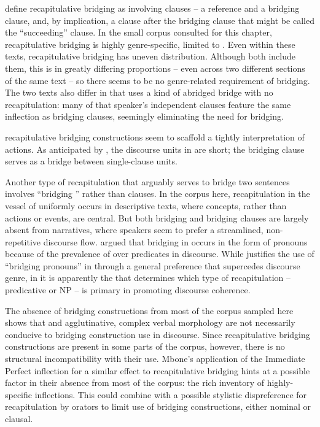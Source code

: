 \documentclass[output=paper]{LSP/langsci}
\begin{document}
 define recapitulative bridging as involving clauses -- a reference and a bridging clause, and, by implication, a clause after the bridging clause that might be called the ``succeeding'' clause. In the small corpus consulted for this chapter,  recapitulative bridging is highly genre-specific, limited to . Even within these texts, recapitulative bridging has uneven distribution. Although both  include them, this is in greatly differing proportions -- even across two different sections of the same text -- so there seems to be no genre-related requirement of bridging. The two texts also differ in that \citet{Mbone2014} uses a kind of abridged bridge with no recapitulation: many of that speaker’s independent clauses feature the same inflection as bridging clauses, seemingly eliminating the need for bridging.

 recapitulative bridging constructions seem to scaffold a tightly  interpretation of actions. As anticipated by , the discourse units in   are short; the bridging clause serves as a bridge between single-clause units. 

Another type of recapitulation that arguably serves to bridge two sentences involves ``bridging '' rather than clauses. In the  corpus here, recapitulation in the vessel of  uniformly occurs in descriptive texts, where concepts, rather than actions or events, are central. But both bridging  and bridging clauses are largely absent from narratives, where  speakers seem to prefer a streamlined, non-repetitive discourse flow. \citet{seifart10} argued that bridging in  occurs in the form of pronouns because of the prevalence of  over predicates in  discourse. While \citet{seifart10} justifies the use of ``bridging pronouns'' in  through a general preference that supercedes discourse genre, in  it is apparently the  that determines which type of recapitulation -- predicative or NP -- is primary in promoting discourse coherence.

The absence of bridging constructions from most of the  corpus sampled here shows that  and agglutinative, complex verbal morphology are not necessarily conducive to bridging construction use in discourse. Since recapitulative bridging constructions are present in some parts of the corpus, however, there is no structural incompatibility with their use. Mbone’s application of the Immediate Perfect inflection for a similar effect to recapitulative bridging hints at a possible factor in their absence from most of the corpus: the rich  inventory of highly-specific  inflections. This could combine with a possible stylistic dispreference for recapitulation by  orators to limit use of bridging constructions, either nominal or clausal.
\end{document}
